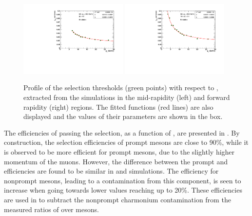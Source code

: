 \begin{figure}[htb!]
 \centering
 \includegraphics[width=0.48\textwidth]{Figures/Charmonia/Analysis/PsiPSignalExtraction/CtauCut/Jpsi_ppPbPbGlb_eff_0p9_Rap_0p0-1p6_Pt_6p5-30p0_Cent_0-100.pdf}
 \includegraphics[width=0.48\textwidth]{Figures/Charmonia/Analysis/PsiPSignalExtraction/CtauCut/Jpsi_ppPbPbGlb_eff_0p9_Rap_1p6-2p4_Pt_3p0-30p0_Cent_0-100.pdf}
 \caption{Profile of the \ctau selection thresholds (green points) with respect to \ptMuMu, extracted from the \JPsi simulations in the mid-rapidity (left) and forward rapidity (right) regions. The fitted functions (red lines) are also displayed and the values of their parameters are shown in the box.}
 \label{fig:CtauCutPtDep}
\end{figure}

The efficiencies of passing the \ctau selection, as a function of \ptMuMu, are presented in  . By construction, the \ctau selection efficiencies of prompt \JPsi mesons are close to 90\%, while it is observed to be more efficient for prompt \PsiP mesons, due to the slightly higher momentum of the muons. However, the difference between the prompt \JPsi and \PsiP efficiencies are found to be similar in \Runpp and \RunPbPb simulations. The efficiency for nonprompt \JPsi mesons, leading to a contamination from this component, is seen  to increase when going towards lower \ptMuMu values reaching up to 20\%. These efficiencies are used in  to subtract the nonprompt charmonium contamination from the measured ratios of \PsiP over \JPsi mesons.

